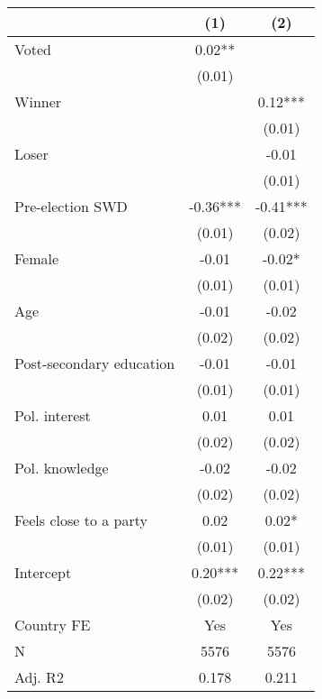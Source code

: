 \begin{tabular}[t]{lcc}
\toprule
  & (1) & (2)\\
\midrule
Voted & 0.02** & \\
 & (0.01) & \\
Winner &  & 0.12***\\
 &  &  (0.01)\\
Loser &  & -0.01\\
 &  & (0.01)\\
Pre-election SWD & -0.36*** & -0.41***\\
 & (0.01) & (0.02)\\
Female & -0.01 & -0.02*\\
 & (0.01) & (0.01)\\
Age & -0.01 & -0.02\\
 & (0.02) & (0.02)\\
Post-secondary education & -0.01 & -0.01\\
 & (0.01) & (0.01)\\
Pol. interest & 0.01 & 0.01\\
 & (0.02) & (0.02)\\
Pol. knowledge & -0.02 & -0.02\\
 & (0.02) & (0.02)\\
Feels close to a party & 0.02 & 0.02*\\
 & (0.01) & (0.01)\\
Intercept & 0.20*** & 0.22***\\
 & (0.02) & (0.02)\\
Country FE & Yes & Yes\\
\midrule
N & 5576 & 5576\\
Adj. R2 & 0.178 & 0.211\\
\bottomrule
\end{tabular}
